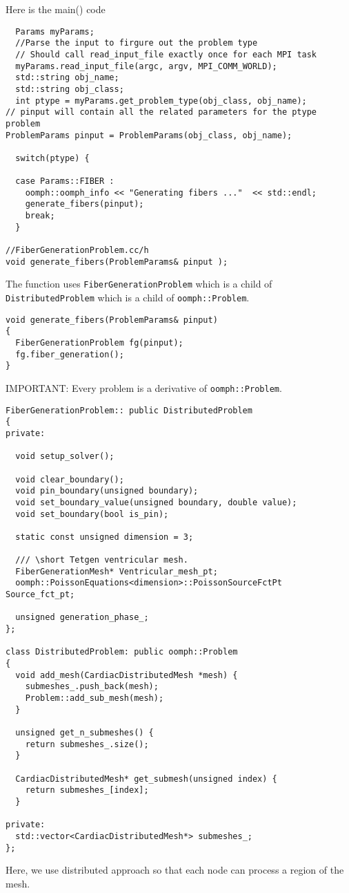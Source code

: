 Here is the main() code
\begin{lstlisting}
  Params myParams;
  //Parse the input to firgure out the problem type
  // Should call read_input_file exactly once for each MPI task
  myParams.read_input_file(argc, argv, MPI_COMM_WORLD);
  std::string obj_name;
  std::string obj_class;
  int ptype = myParams.get_problem_type(obj_class, obj_name);
// pinput will contain all the related parameters for the ptype problem
ProblemParams pinput = ProblemParams(obj_class, obj_name);

  switch(ptype) {
  
  case Params::FIBER :
    oomph::oomph_info << "Generating fibers ..."  << std::endl;
    generate_fibers(pinput);
    break;
  }
  
//FiberGenerationProblem.cc/h
void generate_fibers(ProblemParams& pinput );
\end{lstlisting}

The function uses \verb!FiberGenerationProblem! which is a child of
\verb!DistributedProblem! which is a child of \verb!oomph::Problem!.
\begin{verbatim}
void generate_fibers(ProblemParams& pinput)
{
  FiberGenerationProblem fg(pinput); 
  fg.fiber_generation();
}
\end{verbatim}
IMPORTANT: Every problem is a derivative of \verb!oomph::Problem!.

\begin{lstlisting}
FiberGenerationProblem:: public DistributedProblem
{
private:

  void setup_solver();

  void clear_boundary();
  void pin_boundary(unsigned boundary);
  void set_boundary_value(unsigned boundary, double value);
  void set_boundary(bool is_pin);

  static const unsigned dimension = 3;

  /// \short Tetgen ventricular mesh.
  FiberGenerationMesh* Ventricular_mesh_pt;
  oomph::PoissonEquations<dimension>::PoissonSourceFctPt Source_fct_pt;

  unsigned generation_phase_;
};

class DistributedProblem: public oomph::Problem
{ 
  void add_mesh(CardiacDistributedMesh *mesh) {
    submeshes_.push_back(mesh);
    Problem::add_sub_mesh(mesh);
  }
  
  unsigned get_n_submeshes() {
    return submeshes_.size();
  }
  
  CardiacDistributedMesh* get_submesh(unsigned index) {
    return submeshes_[index];
  }

private:
  std::vector<CardiacDistributedMesh*> submeshes_;
};
\end{lstlisting}
Here, we use distributed approach so that each node can process a region of the
mesh.


